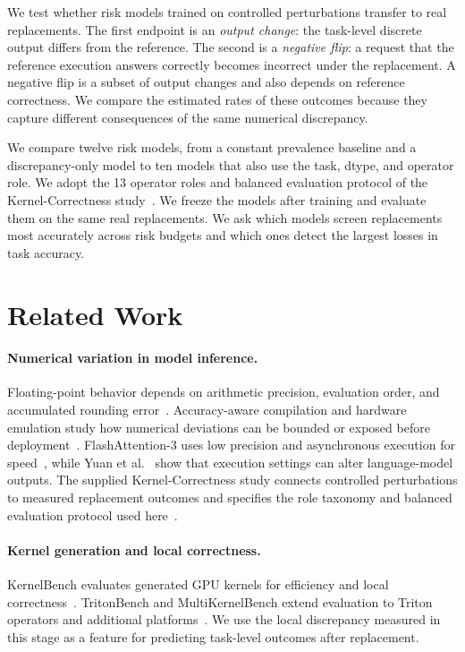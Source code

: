 \documentclass{article}
\begin{document}
We test whether risk models trained on controlled perturbations transfer to real replacements. The first endpoint is an \emph{output change}: the task-level discrete output differs from the reference. The second is a \emph{negative flip}: a request that the reference execution answers correctly becomes incorrect under the replacement. A negative flip is a subset of output changes and also depends on reference correctness. We compare the estimated rates of these outcomes because they capture different consequences of the same numerical discrepancy.

We compare twelve risk models, from a constant prevalence baseline and a discrepancy-only model to ten models that also use the task, dtype, and operator role. We adopt the 13 operator roles and balanced evaluation protocol of the Kernel-Correctness study~\citep{kernel_correctness_protocol}. We freeze the models after training and evaluate them on the same real replacements. We ask which models screen replacements most accurately across risk budgets and which ones detect the largest losses in task accuracy.


\section{Related Work}

\paragraph{Numerical variation in model inference.}
Floating-point behavior depends on arithmetic precision, evaluation order, and accumulated rounding error~\citep{higham2002accuracy}. Accuracy-aware compilation and hardware emulation study how numerical deviations can be bounded or exposed before deployment~\citep{sharif2019approxhpvm,jiang2023arbitor}. FlashAttention-3 uses low precision and asynchronous execution for speed~\citep{shah2024flashattention3}, while Yuan et al.~\citep{yuan2025nondeterminism} show that execution settings can alter language-model outputs. The supplied Kernel-Correctness study connects controlled perturbations to measured replacement outcomes and specifies the role taxonomy and balanced evaluation protocol used here~\citep{kernel_correctness_protocol}.

\paragraph{Kernel generation and local correctness.}
KernelBench evaluates generated GPU kernels for efficiency and local correctness~\citep{ouyang2025kernelbench}. TritonBench and MultiKernelBench extend evaluation to Triton operators and additional platforms~\citep{li2025tritonbench,wen2025multikernelbench}. We use the local discrepancy measured in this stage as a feature for predicting task-level outcomes after replacement.
\end{document}
